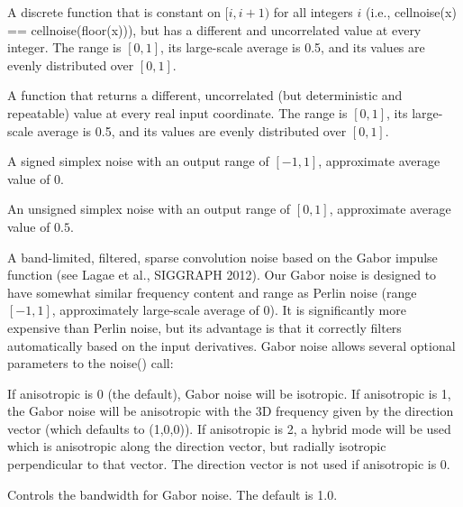 \documentclass[11pt,letterpaper]{book}
\begin{document}
\vspace{12pt}
A discrete function that is constant on $[i,i+1)$ for all integers $i$
(i.e., {\cf cellnoise(x) == cellnoise(floor(x))}), but has a different
and uncorrelated value at every integer.  The range is $[0,1]$, its
large-scale average is 0.5, and its values are evenly distributed over
$[0,1]$.
\apiend

\vspace{12pt}
A function that returns a different, uncorrelated (but deterministic and
repeatable) value at every real input coordinate.  The range is $[0,1]$, its
large-scale average is 0.5, and its values are evenly distributed over
$[0,1]$.
\apiend

\vspace{12pt}
A signed simplex noise with an output range of $[-1,1]$,
approximate average value of $0$.
\apiend

\vspace{12pt}
An unsigned simplex noise with an output range of $[0,1]$,
approximate average value of $0.5$.
\apiend

\vspace{12pt}
A band-limited, filtered, sparse convolution noise based on the
Gabor impulse function (see Lagae et al., SIGGRAPH 2012).  Our Gabor
noise is designed to have somewhat similar frequency content and range
as Perlin noise (range $[-1,1]$, approximately large-scale average of
$0$).  It is significantly more expensive than Perlin noise, but its
advantage is that it correctly filters automatically based on the input
derivatives.  Gabor noise allows several optional parameters to the
{\cf noise()} call:

\vspace{12pt}
If {\cf anisotropic} is 0 (the default), Gabor noise
will be isotropic.  If {\cf anisotropic} is 1, the Gabor noise will
be anisotropic with the 3D frequency given by the {\cf direction} 
vector (which defaults to {\cf (1,0,0)}).  If {\cf anisotropic} is
2, a hybrid mode will be used which is anisotropic along the
{\cf direction} vector, but radially isotropic perpendicular to that
vector.  The {\cf direction} vector is not used if {\cf anisotropic}
is 0.
\apiend
\vspace{-16pt}

\vspace{12pt}
Controls the bandwidth for Gabor noise.
The default is 1.0.
\apiend
\vspace{-16pt}
\end{document}
